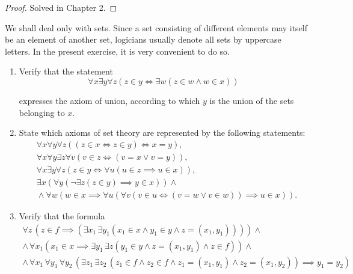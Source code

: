 \begin{proof}
    Solved in Chapter 2.
\end{proof}
\newpage

\begin{exercise}
    We shall deal only with sets. Since a set consisting of different elements may
    itself be an element of another set, logicians usually denote all sets by uppercase
    letters. In the present exercise, it is very convenient to do so.
    \begin{enumerate}[label={(\alph*)}]
        \item Verify that the statement
              \[
                  \forall x \exists y \forall z \left( z\in y \Leftrightarrow \exists w (z\in w \land w\in x) \right)
              \]

              expresses the axiom of union, according to which $y$ is the union of the sets belonging to $x$.
        \item State which axioms of set theory are represented by the following statements:
              \begin{align*}
                   & \forall x\forall y\forall z\left((z\in x\Leftrightarrow z\in y) \Leftrightarrow x = y\right),                                                                   \\
                   & \forall x\forall y\exists z\forall v\left( v\in z \Leftrightarrow (v = x\lor v = y) \right),                                                                    \\
                   & \forall x\exists y\forall z\left(z\in y\Leftrightarrow \forall u (u\in z\implies u\in x)\right),                                                                \\
                   & \exists x\left(\forall y \left(\neg \exists z(z\in y)\implies y\in x\right)\right) \land                                                                        \\
                   & \phantom{   } \land \forall w\left(w\in x\implies \forall u\left( \forall v\left(v\in u\Leftrightarrow (v = w\lor v\in w)\right)\implies u\in x \right)\right).
              \end{align*}
        \item Verify that the formula
              \begin{gather*}
                  \forall z\, \left( z\in f \implies \left( \exists x_{1}\,\exists y_{1} \left( x_{1}\in x\land y_{1}\in y\land z = (x_{1}, y_{1}) \right) \right) \right) \land \\
                  \land\, \forall x_{1}\left( x_{1}\in x \implies \exists y_{1}\,\exists z \left( y_{1}\in y\land z = (x_{1}, y_{1})\land z\in f \right) \right) \land \\
                  \land\, \forall x_{1}\,\forall y_{1}\,\forall y_{2}\, \left( \exists z_{1}\,\exists z_{2}\,\left( z_{1}\in f\land z_{2}\in f \land z_{1} = (x_{1}, y_{1}) \land z_{2} = (x_{1}, y_{2}) \right) \implies y_{1} = y_{2} \right)
              \end{gather*}


\end{enumerate}
\end{exercise}
